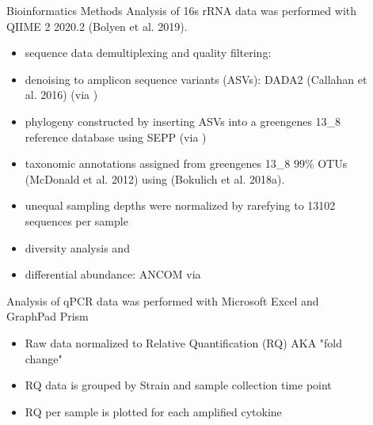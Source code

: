 \documentclass[final]{beamer}
\newlength{\sepwidth}
\newlength{\colwidth}
\newcommand{\separatorcolumn}{\begin{column}{\sepwidth}\end{column}}
\begin{document}
\begin{frame}[t]
\begin{columns}[t]
\begin{column}{\colwidth}
\begin{block}{Bioinformatics Methods}
    Analysis of 16s rRNA data was performed with QIIME 2 2020.2 (Bolyen et al. 2019).
    \begin{itemize}
      \item {sequence data demultiplexing and quality filtering: }
      \item {denoising to amplicon sequence variants (ASVs): DADA2 (Callahan et al. 2016) (via )}
      \item {phylogeny constructed by inserting ASVs into a greengenes 13\_8 reference database using SEPP (via )}
      \item {taxonomic annotations assigned from greengenes 13\_8 99\% OTUs (McDonald et al. 2012) using  (Bokulich et al. 2018a).}
      \item {unequal sampling depths were normalized by rarefying to 13102 sequences per sample}
      \item {diversity analysis   and }
      \item {differential abundance: ANCOM via }
    \end{itemize}

    Analysis of qPCR data was performed with Microsoft Excel and GraphPad Prism
    \begin{itemize}
      \item {Raw data normalized to Relative Quantification (RQ) AKA "fold change"}
      \item {RQ data is grouped by Strain and sample collection time point}
      \item {RQ per sample is plotted for each amplified cytokine}
    \end{itemize} 

  \end{block}

\end{column}

\separatorcolumn

\begin{column}{\colwidth}


\end{column}
\end{columns}
\end{frame}
\end{document}
